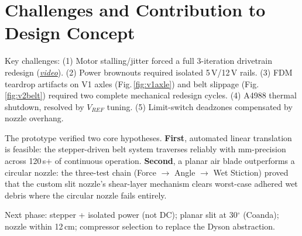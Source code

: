 \documentclass[12pt, letterpaper]{article}
\begin{document}
\section{Challenges and Contribution to Design Concept}

Key challenges: (1) Motor stalling/jitter forced a full 3-iteration drivetrain redesign (\href{https://drive.google.com/drive/folders/1wNK_jYUvHXoMne_cIdYbAIURdvYpuG-J}{\textit{video}}). (2) Power brownouts required isolated 5\,V/12\,V rails. (3) FDM teardrop artifacts on V1 axles (Fig.\,\ref{fig:v1axle}) and belt slippage (Fig.\,\ref{fig:v2belt}) required two complete mechanical redesign cycles. (4) A4988 thermal shutdown, resolved by $V_{REF}$ tuning. (5) Limit-switch deadzones compensated by nozzle overhang.

The prototype verified two core hypotheses. \textbf{First}, automated linear translation is feasible: the stepper-driven belt system traverses reliably with mm-precision across 120\,s+ of continuous operation. \textbf{Second}, a planar air blade outperforms a circular nozzle: the three-test chain (Force $\rightarrow$ Angle $\rightarrow$ Wet Stiction) proved that the custom slit nozzle's shear-layer mechanism clears worst-case adhered wet debris where the circular nozzle fails entirely.

Next phase: stepper + isolated power (not DC); planar slit at 30$^\circ$ (Coanda); nozzle within 12\,cm; compressor selection to replace the Dyson abstraction.
\end{document}
